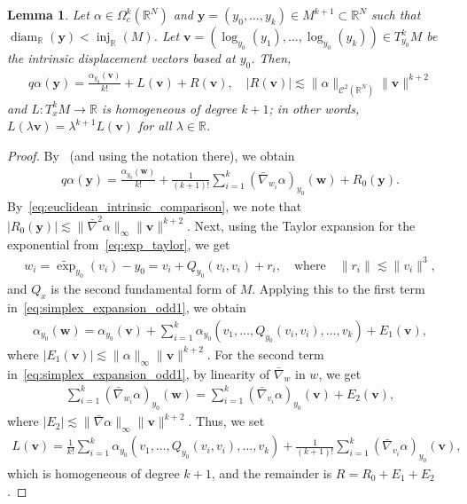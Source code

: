 \documentclass[11pt,reqno]{amsproc}
\numberwithin{equation}{section}
\newcommand{\R}{\mathbb{R}}
\newcommand{\by}{\mathbf{y}}
\newcommand{\bv}{\mathbf{v}}
\newcommand{\bw}{\mathbf{w}}
\newcommand{\cC}{\mathcal{C}}
\newcommand{\texp}{\widetilde{\exp}}
\newcommand{\ls}{\lesssim}
\newcommand{\inj}{\operatorname{inj}}
\newcommand{\diam}{\operatorname{diam}}
\newtheorem{lemma}[counter]{Lemma}
\theoremstyle{definition}
\theoremstyle{plain}
\begin{document}
    \begin{lemma} \label{lem:geometric_simplex_integral}
        Let $\alpha \in \Omega^k_c(\R^N)$ and $\by =(y_0, \ldots, y_k) \in M^{k+1} \subset \R^N$ such that $\diam_\R(\by) < \inj_\R(M)$. Let $\bv = (\log_{y_0}(y_1), \ldots, \log_{y_0}(y_k)) \in T_{y_0}^k M$ be the intrinsic displacement vectors based at $y_0$. Then,
        \begin{align}
            q\alpha(\by) = \frac{\alpha_{y_0}(\bv)}{k!} + L(\bv) + R(\bv), \quad |R(\bv)| \ls \| \alpha\|_{\cC^2(\R^N)} \|\bv\|^{k+2}
        \end{align}
        and $L: T^k_x M \to \R$ is homogeneous of degree $k+1$; in other words, $L(\lambda \bv) = \lambda^{k+1} L(\bv)$ for all $\lambda \in \R$.
    \end{lemma}
    \begin{proof}
        By~ (and using the notation there), we obtain
        \begin{align} \label{eq:simplex_expansion_odd1}
            q\alpha(\by) = \frac{\alpha_{y_0}(\bw)}{k!} + \frac{1}{(k+1)!} \sum_{i=1}^k (\bar\nabla_{w_i} \alpha)_{y_0}(\bw) + R_0(\by). 
        \end{align}
        By~\eqref{eq:euclidean_intrinsic_comparison}, we note that $|R_0(\by)| \ls \|\bar\nabla^2 \alpha\|_\infty \|\bv\|^{k+2}$. Next, using the Taylor expansion for the exponential from~\eqref{eq:exp_taylor}, we get
        \begin{align}
            w_i = \texp_{y_0}(v_i)-y_0 = v_i + Q_{y_0}(v_i, v_i) + r_i, \quad \text{where} \quad \|r_i\| \ls \|v_i\|^3,
        \end{align}
        and $Q_x$ is the second fundamental form of $M$. Applying this to the first term in~\eqref{eq:simplex_expansion_odd1}, we obtain
        \begin{align}
            \alpha_{y_0}(\bw) = \alpha_{y_0}(\bv) + \sum_{i=1}^k \alpha_{y_0}(v_1, \ldots, Q_{y_0}(v_i,v_i), \ldots, v_k) + E_1(\bv),
        \end{align}
        where $|E_1(\bv)| \ls \|\alpha\|_\infty \|\bv\|^{k+2}$. 
        For the second term in~\eqref{eq:simplex_expansion_odd1}, by linearity of $\bar\nabla_w$ in $w$, we get
        \begin{align}
            \sum_{i=1}^k (\bar\nabla_{w_i}\alpha)_{y_0}(\bw) = \sum_{i=1}^k (\bar\nabla_{v_i}\alpha)_{y_0}(\bv) + E_2(\bv),
        \end{align}
        where $|E_2| \ls \|\bar\nabla\alpha\|_\infty \|\bv\|^{k+2}$. Thus, we set
        \begin{align}
            L(\bv) = \frac{1}{k!}\sum_{i=1}^k \alpha_{y_0}(v_1, \ldots, Q_{y_0}(v_i,v_i), \ldots, v_k) + \frac{1}{(k+1)!} \sum_{i=1}^k (\bar\nabla_{v_i}\alpha)_{y_0}(\bv),
        \end{align}
        which is homogeneous of degree $k+1$, and the remainder is $R = R_0 + E_1 + E_2$. 
    \end{proof}
\end{document}
